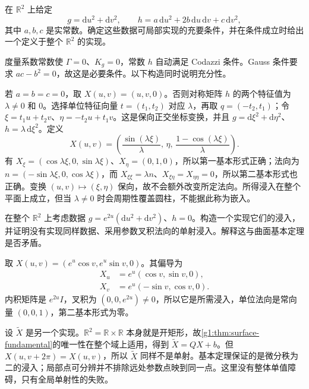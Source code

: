 \begin{exercise}
	\label{g1:ex:constant-surface-data}
	在 \(\mathbb R^2\) 上给定
	\[
		g=\mathrm{d}u^2+\mathrm{d}v^2,\qquad h=a\,\mathrm{d}u^2+2b\,\mathrm{d}u\,\mathrm{d}v+c\,\mathrm{d}v^2,
	\]
	其中 \(a,b,c\) 是实常数。确定这些数据可局部实现的充要条件，并在条件成立时给出一个定义于整个 \(\mathbb R^2\) 的实现。
\end{exercise}

\begin{solution}
	度量系数常数使 \(\Gamma=0\)、\(K_g=0\)，常数 \(h\) 自动满足 Codazzi 条件。Gauss 条件要求 \(ac-b^2=0\)，故这是必要条件。以下构造同时说明充分性。

	若 \(a=b=c=0\)，取 \(X(u,v)=(u,v,0)\)。否则对称矩阵 \(h\) 的两个特征值为 \(\lambda\ne0\) 和 \(0\)。选择单位特征向量 \(t=(t_1,t_2)\) 对应 \(\lambda\)，再取 \(q=(-t_2,t_1)\)；令 \(\xi=t_1u+t_2v\)、\(\eta=-t_2u+t_1v\)。这是保向正交坐标变换，并且 \(g=\mathrm{d}\xi^2+\mathrm{d}\eta^2\)、\(h=\lambda\,\mathrm{d}\xi^2\)。定义
	\[
		X(u,v)=\left(\frac{\sin(\lambda\xi)}{\lambda},\,\eta,\,
		\frac{1-\cos(\lambda\xi)}{\lambda}\right).
	\]
	有 \(X_\xi=(\cos\lambda\xi,0,\sin\lambda\xi)\)、\(X_\eta=(0,1,0)\)，所以第一基本形式正确；法向为 \(n=(-\sin\lambda\xi,0,\cos\lambda\xi)\)，而 \(X_{\xi\xi}=\lambda n\)、\(X_{\xi\eta}=X_{\eta\eta}=0\)，所以第二基本形式也正确。变换 \((u,v)\mapsto(\xi,\eta)\) 保向，故不会额外改变所定法向。所得浸入在整个平面上成立，但当 \(\lambda\ne0\) 时会周期性覆盖圆柱，不能据此称为嵌入。
\end{solution}

\begin{exercise}
	\label{g1:ex:simply-connected-surface-overlap}
	在整个 \(\mathbb R^2\) 上考虑数据 \(g=e^{2u}(\mathrm{d}u^2+\mathrm{d}v^2)\)、\(h=0\)。构造一个实现它们的浸入，并证明没有实现同样数据、采用参数叉积法向的单射浸入。解释这与曲面基本定理是否矛盾。
\end{exercise}

\begin{solution}
	取 \(X(u,v)=(e^u\cos v,e^u\sin v,0)\)。其偏导为
	\begin{align*}
		X_u&=e^u(\cos v,\sin v,0),\\
		X_v&=e^u(-\sin v,\cos v,0).
	\end{align*}
	内积矩阵是 \(e^{2u}I\)，叉积为 \((0,0,e^{2u})\ne0\)，所以它是所需浸入，单位法向是常向量 \((0,0,1)\)，第二基本形式为零。

	设 \(\widetilde X\) 是另一个实现。\(\mathbb R^2=\mathbb R\times\mathbb R\) 本身就是开矩形，故\cref{g1:thm:surface-fundamental}的唯一性在整个域上适用，得到 \(\widetilde X=QX+b\)。但 \(X(u,v+2\pi)=X(u,v)\)，所以 \(\widetilde X\) 同样不是单射。基本定理保证的是微分秩为二的浸入；局部点可分辨并不排除远处参数点映到同一点。这里没有整体单值障碍，只有全局单射性的失败。
\end{solution}

